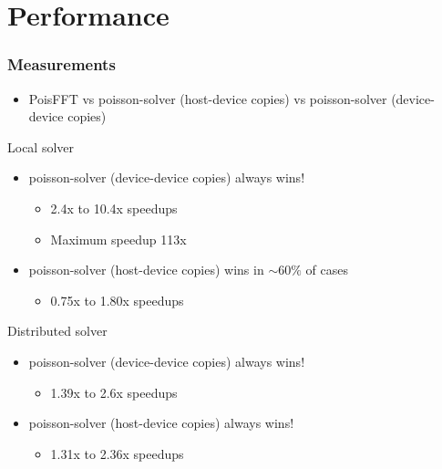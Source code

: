 \documentclass{beamer}
\begin{document}
\section{Performance}
\begin{frame}
    \frametitle{Measurements}
    \begin{itemize}
        \item PoisFFT \pause vs poisson-solver (host-device copies) \pause vs poisson-solver (device-device copies)\pause
    \end{itemize}
    \begin{block}{Local solver}
        \begin{itemize}
            \item poisson-solver (device-device copies) always wins!
            \begin{itemize}
                \item 2.4x to 10.4x speedups
                \item Maximum speedup 113x\pause
            \end{itemize}
            \item poisson-solver (host-device copies) wins in $\sim 60\%$ of cases
            \begin{itemize}
                \item 0.75x to 1.80x speedups\pause
            \end{itemize}
        \end{itemize}
    \end{block}
    \begin{exampleblock}{Distributed solver}
        \begin{itemize}
            \item poisson-solver (device-device copies) always wins!
            \begin{itemize}
                \item 1.39x to 2.6x speedups\pause
            \end{itemize}
            \item poisson-solver (host-device copies) always wins!
            \begin{itemize}
                \item 1.31x to 2.36x speedups
            \end{itemize}
        \end{itemize}
    \end{exampleblock}
\end{frame}
\end{document}
